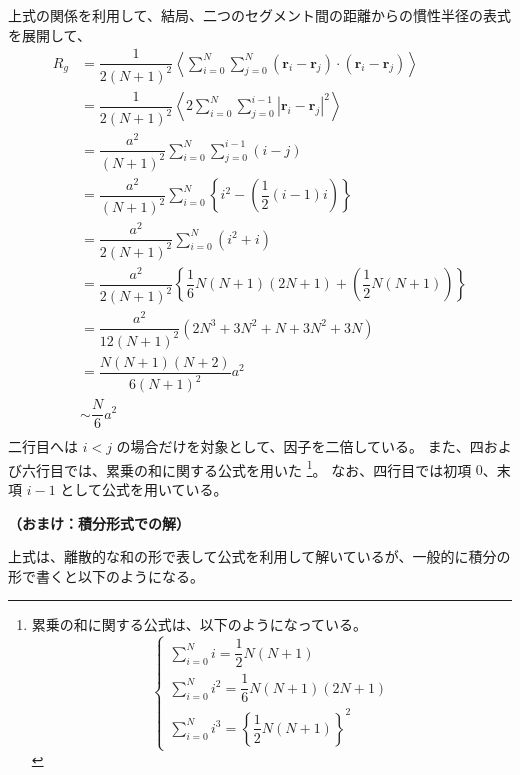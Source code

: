 \documentclass[uplatex,dvipdfmx,a4paper,11pt]{jsarticle}
\begin{document}
上式の関係を利用して、結局、二つのセグメント間の距離からの慣性半径の表式を展開して、
\begin{align*}
R_g 
	&= \dfrac{1}{2(N+1)^2} \left \langle \sum_{i=0}^N \sum_{j=0}^N (\bm{r}_i - \bm{r}_j) \cdot (\bm{r}_i - \bm{r}_j) \right \rangle\\
	&= \dfrac{1}{2(N+1)^2} \left \langle 2 \sum_{i=0}^N \sum_{j=0}^{i-1} \left|\bm{r}_i - \bm{r}_j \right|^2 \right \rangle\\
	&= \dfrac{a^2}{(N+1)^2} \sum_{i=0}^N \sum_{j=0}^{i-1} (i -j) \\
	&= \dfrac{a^2}{(N+1)^2} \sum_{i=0}^N \left \{i^2 - \left (\dfrac{1}{2} \left (i-1 \right ) i \right) \right\} \\
	&= \dfrac{a^2}{2(N+1)^2} \sum_{i=0}^N (i^2 + i) \\
	&= \dfrac{a^2}{2(N+1)^2} \left\{ \dfrac{1}{6} N (N+1)(2N+1) + \left (\dfrac{1}{2} N (N + 1) \right) \right\} \\
	&= \dfrac{a^2}{12(N+1)^2} ( 2N^3  + 3N^2 + N + 3N^2 + 3N ) \\
	&= \dfrac{N(N+1)(N+2) }{6(N+1)^2} a^2\\
	&\sim \dfrac{N}{6} a^2\\
\end{align*}
二行目へは $i < j$ の場合だけを対象として、因子を二倍している。
また、四および六行目では、累乗の和に関する公式を用いた
\footnote{
累乗の和に関する公式は、以下のようになっている。
\begin{equation*}
\begin{cases}
\displaystyle \sum_{i=0}^{N} i = \dfrac{1}{2} N (N+1) \\[12pt]
\displaystyle \sum_{i=0}^{N} i^2 = \dfrac{1}{6} N (N+1)(2N+1) \\[12pt]
\displaystyle \sum_{i=0}^{N} i^3 = \left\{\dfrac{1}{2} N (N+1) \right\}^2
\end{cases}
\end{equation*}
}。
なお、四行目では初項 $0$、末項 $i-1$ として公式を用いている。 


\newpage
{\bf （おまけ：積分形式での解）}

上式は、離散的な和の形で表して公式を利用して解いているが、一般的に積分の形で書くと以下のようになる。
\end{document}
